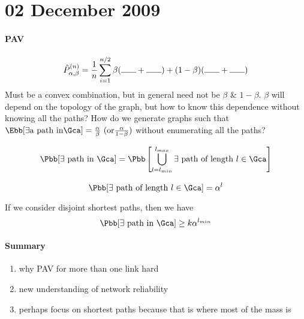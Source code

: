 \section{02 December 2009}
\paragraph{\acf{PAV}}
\begin{displaymath}
\hat{P}_{\alpha,\beta}^{(n)} = \frac{1}{n}\sum_{i=1}^{n/2}\beta(\makebox[0.25in]{\hrulefill} + \makebox[0.25in]{\hrulefill}) +  (1-\beta)(\makebox[0.25in]{\hrulefill} + \makebox[0.25in]{\hrulefill})
\end{displaymath}
Must be a convex combination, but in general need not be $\beta$ \& $1-\beta$. $\beta$ will depend on the topology of the graph, but how to know this dependence without knowing all the paths? How do we generate graphs such that $\Ebb[\exists \mbox{a path in} \Gca]=\frac{\alpha}{\beta}~(\mbox{or} \frac{\alpha}{1-\beta})$ without enumerating all the paths? 

\begin{displaymath}
\Pbb[\exists~\mbox{path in}~\Gca] = \Pbb\left[\bigcup_{l=l_{min}}^{l_{max}}\exists~\mbox{path of length}~l \in \Gca\right]
\end{displaymath}

\begin{displaymath}
\Pbb[\exists~\mbox{path of length}~l \in \Gca] = \alpha^l
\end{displaymath}

If we consider disjoint shortest paths, then we have
\begin{displaymath}
\Pbb[\exists~\mbox{path in}~\Gca] \geq k\alpha^{l_{min}}
\end{displaymath}

\paragraph{Summary}
\begin{enumerate}
	\item why \ac{PAV} for more than one link hard
	\item new understanding of network reliability
	\item perhaps focus on shortest paths because that is where most of the mass is
\end{enumerate}